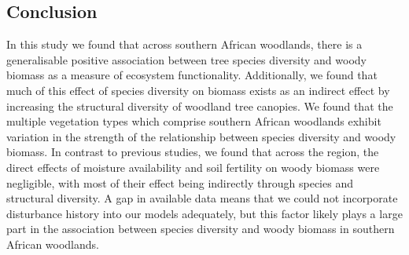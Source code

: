 \documentclass[11pt,a4paper]{article}
\begin{document}




\subsection{Conclusion}

In this study we found that across southern African woodlands, there is a generalisable positive association between tree species diversity and woody biomass as a measure of ecosystem functionality. Additionally, we found that much of this effect of species diversity on biomass exists as an indirect effect by increasing the structural diversity of woodland tree canopies. We found that the multiple vegetation types which comprise southern African woodlands exhibit variation in the strength of the relationship between species diversity and woody biomass. In contrast to previous studies, we found that across the region, the direct effects of moisture availability and soil fertility on woody biomass were negligible, with most of their effect being indirectly through species and structural diversity. A gap in available data means that we could not incorporate disturbance history into our models adequately, but this factor likely plays a large part in the association between species diversity and woody biomass in southern African woodlands.
\end{document}
